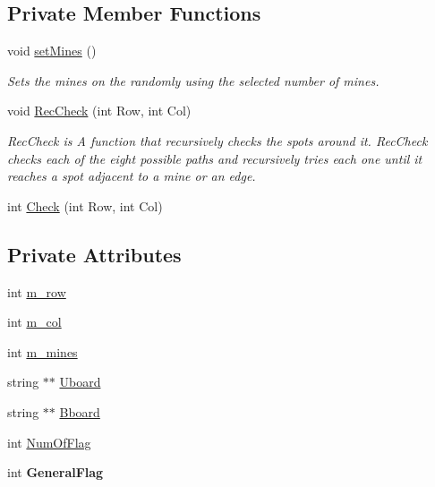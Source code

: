 \subsection*{Private Member Functions}
\begin{DoxyCompactItemize}
\item 
void \hyperlink{classMinesweeper_a3150b5ddb8317214df23b2836ef12f50}{set\+Mines} ()
\begin{DoxyCompactList}\small\item\em Sets the mines on the randomly using the selected number of mines. \end{DoxyCompactList}\item 
void \hyperlink{classMinesweeper_ac86d9717b1312d79e6cd9d56e258a7e6}{Rec\+Check} (int Row, int Col)
\begin{DoxyCompactList}\small\item\em Rec\+Check is A function that recursively checks the spots around it. Rec\+Check checks each of the eight possible paths and recursively tries each one until it reaches a spot adjacent to a mine or an edge. \end{DoxyCompactList}\item 
int \hyperlink{classMinesweeper_a2c4f9e490db8fda6bef5cd5c532c49e5}{Check} (int Row, int Col)
\end{DoxyCompactItemize}
\subsection*{Private Attributes}
\begin{DoxyCompactItemize}
\item 
int \hyperlink{classMinesweeper_a47b1d8996740c300ba320a207833f3ff}{m\+\_\+row}
\item 
int \hyperlink{classMinesweeper_a1a42dbff44098fe674d172907ff0a224}{m\+\_\+col}
\item 
int \hyperlink{classMinesweeper_aa20d1458dce4ca9a3accd312df2e882e}{m\+\_\+mines}
\item 
string $\ast$$\ast$ \hyperlink{classMinesweeper_ac8e42ed2ff1dccc35d9a9529ffafe9a4}{Uboard}
\item 
string $\ast$$\ast$ \hyperlink{classMinesweeper_aa990cf0cf6d3ffe348e93b0b176db90f}{Bboard}
\item 
int \hyperlink{classMinesweeper_aa11ba428693510b67f95979f6762b8c6}{Num\+Of\+Flag}
\item 
\mbox{\label{classMinesweeper_ab5176cc107e7d982fe8719f3a52fa64d}} 
int {\bfseries General\+Flag}
\end{DoxyCompactItemize}



